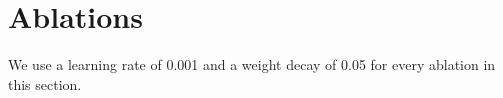 \documentclass{article}
\begin{document}
\section{Ablations}

We use a learning rate of 0.001 and a weight decay of 0.05 for every ablation
in this section.
\end{document}
